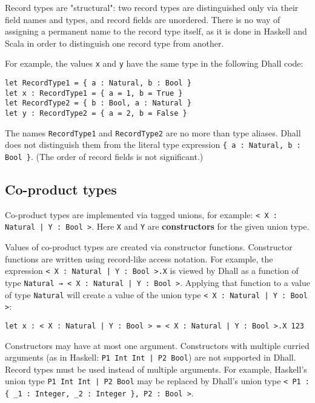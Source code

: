 Record types are "structural": two record types are distinguished only via their field names and types, and record fields are unordered.
There is no way of assigning a permanent name to the record type itself, as it is done in Haskell and Scala in order to distinguish one record type from another.


For example, the values \lstinline!x! and \lstinline!y! have the same type in the following Dhall code:


\begin{lstlisting}[language=Dhall]
let RecordType1 = { a : Natural, b : Bool }
let x : RecordType1 = { a = 1, b = True }
let RecordType2 = { b : Bool, a : Natural }
let y : RecordType2 = { a = 2, b = False }
\end{lstlisting}


The names \lstinline!RecordType1! and \lstinline!RecordType2! are no more than type aliases.
Dhall does not distinguish them from the literal type expression \lstinline!{ a : Natural, b : Bool }!.
(The order of record fields is not significant.) 


\subsection{Co-product types}


Co-product types are implemented via tagged unions, for example: \lstinline!< X : Natural | Y : Bool >!.
Here \lstinline!X! and \lstinline!Y! are \textbf{constructors} for the given union type.


Values of co-product types are created via constructor functions.
Constructor functions are written using record-like access notation.
For example, the expression \lstinline!< X : Natural | Y : Bool >.X! is viewed by Dhall as a function of type \lstinline!Natural → < X : Natural | Y : Bool >!. 
Applying that function to a value of type \lstinline!Natural! will create a value of the union type \lstinline!< X : Natural | Y : Bool >!:


\begin{lstlisting}[language=Dhall]
let x : < X : Natural | Y : Bool > = < X : Natural | Y : Bool >.X 123
\end{lstlisting}


Constructors may have at most one argument.
Constructors with multiple curried arguments (as in Haskell: \lstinline!P1 Int Int | P2 Bool!) are not supported in Dhall.
Record types must be used instead of multiple arguments.
For example, Haskell's union type \lstinline!P1 Int Int | P2 Bool! may be replaced by Dhall's union type \lstinline!< P1 : { _1 : Integer, _2 : Integer }, P2 : Bool >!.


